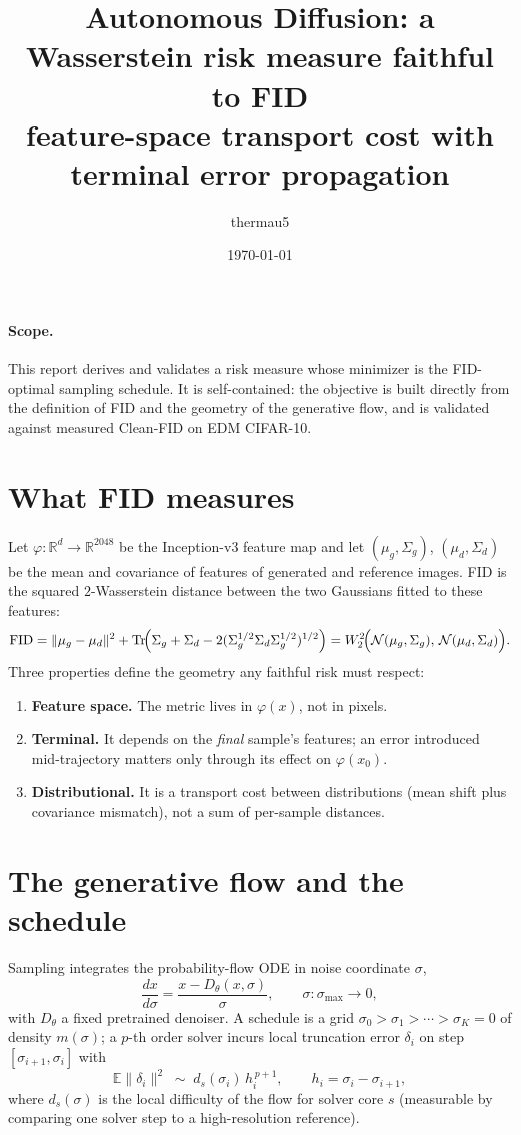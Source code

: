 \documentclass[11pt]{article}
\title{Autonomous Diffusion: a Wasserstein risk measure faithful to FID\\
       {\large feature-space transport cost with terminal error propagation}}
\author{thermau5}
\date{\today}
\begin{document}
\maketitle

\paragraph{Scope.} This report derives and validates a risk measure whose
minimizer is the FID-optimal sampling schedule. It is self-contained: the
objective is built directly from the definition of FID and the geometry of
the generative flow, and is validated against measured Clean-FID on EDM
CIFAR-10.

\section{What FID measures}
\label{sec:fid}

Let $\varphi:\mathbb R^{d}\to\mathbb R^{2048}$ be the Inception-v3 feature
map and let $(\mu_g,\Sigma_g)$, $(\mu_d,\Sigma_d)$ be the mean and
covariance of features of generated and reference images. FID is the
squared $2$-Wasserstein distance between the two Gaussians fitted to these
features:
\[
\mathrm{FID}
=\lVert\mu_g-\mu_d\rVert^2
 +\operatorname{Tr}\!\Bigl(\Sigma_g+\Sigma_d-2(\Sigma_g^{1/2}\Sigma_d\Sigma_g^{1/2})^{1/2}\Bigr)
=W_2^2\!\Bigl(\mathcal N(\mu_g,\Sigma_g),\,\mathcal N(\mu_d,\Sigma_d)\Bigr).
\]
Three properties define the geometry any faithful risk must respect:
\begin{enumerate}
\item \textbf{Feature space.} The metric lives in $\varphi(x)$, not in
pixels.
\item \textbf{Terminal.} It depends on the \emph{final} sample's features;
an error introduced mid-trajectory matters only through its effect on
$\varphi(x_0)$.
\item \textbf{Distributional.} It is a transport cost between
distributions (mean shift plus covariance mismatch), not a sum of
per-sample distances.
\end{enumerate}

\section{The generative flow and the schedule}
\label{sec:flow}

Sampling integrates the probability-flow ODE in noise coordinate $\sigma$,
\[
\frac{dx}{d\sigma}=\frac{x-D_\theta(x,\sigma)}{\sigma},
\qquad \sigma:\sigma_{\max}\to 0,
\]
with $D_\theta$ a fixed pretrained denoiser. A schedule is a grid
$\sigma_0>\sigma_1>\cdots>\sigma_K=0$ of density $m(\sigma)$; a $p$-th
order solver incurs local truncation error $\delta_i$ on step
$[\sigma_{i+1},\sigma_i]$ with
\[
\mathbb E\lVert\delta_i\rVert^2 \;\sim\; d_s(\sigma_i)\,h_i^{\,p+1},
\qquad h_i=\sigma_i-\sigma_{i+1},
\]
where $d_s(\sigma)$ is the local difficulty of the flow for solver core
$s$ (measurable by comparing one solver step to a high-resolution
reference).
\end{document}
